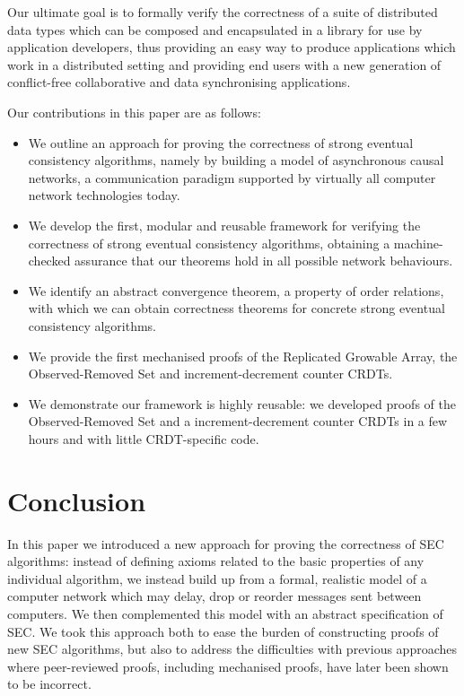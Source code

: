 \documentclass[acmlarge,review,anonymous]{acmart}\settopmatter{printfolios=true}
\begin{document}
Our ultimate goal is to formally verify the correctness of a suite of distributed data types which can be composed and encapsulated in a library for use by application developers, thus providing an easy way to produce applications which work in a distributed setting and providing end users with a new generation of conflict-free collaborative and data synchronising applications.

Our contributions in this paper are as follows:
\begin{itemize}
\item We outline an approach for proving the correctness of strong eventual consistency algorithms, namely by building a model of asynchronous causal networks, a communication paradigm supported by virtually all computer network technologies today.
%
\item We develop the first, modular and reusable framework for verifying the correctness of strong eventual consistency algorithms, obtaining a machine-checked assurance that our theorems hold in all possible network behaviours.
%
\item We identify an abstract convergence theorem, a property of order relations, with which we can obtain correctness theorems for concrete strong eventual consistency algorithms.
%
\item We provide the first mechanised proofs of the Replicated Growable Array, the Observed-Removed Set and increment-decrement counter CRDTs. 
%
\item We demonstrate our framework is highly reusable: we developed proofs of the Observed-Removed Set and a increment-decrement counter CRDTs in a few hours and with little CRDT-specific code.
\end{itemize}









\section{Conclusion}
\label{sect.conclusion}

In this paper we introduced a new approach for proving the correctness of SEC algorithms: instead of defining axioms related to the basic properties of any individual algorithm, we instead build up from a formal, realistic model of a computer network which may delay, drop or reorder messages sent between computers.
We then complemented this model with an abstract specification of SEC.
We took this approach both to ease the burden of constructing proofs of new SEC algorithms, but also to address the difficulties with previous approaches where peer-reviewed proofs, including mechanised proofs, have later been shown to be incorrect.
\end{document}

